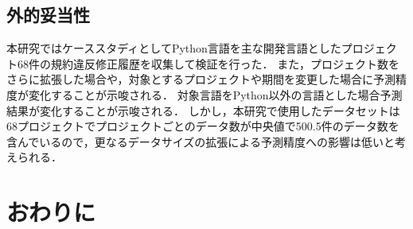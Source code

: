 \documentclass[paper]{ieicej}
\begin{document}


\subsection{外的妥当性}

本研究ではケーススタディとしてPython言語を主な開発言語としたプロジェクト68件の規約違反修正履歴を収集して検証を行った．
また，プロジェクト数をさらに拡張した場合や，対象とするプロジェクトや期間を変更した場合に予測精度が変化することが示唆される．
対象言語をPython以外の言語とした場合予測結果が変化することが示唆される．
しかし，本研究で使用したデータセットは68プロジェクトでプロジェクトごとのデータ数が中央値で500.5件のデータ数を含んでいるので，更なるデータサイズの拡張による予測精度への影響は低いと考えられる．



\section{おわりに}\label{chap:end}

\end{document}
